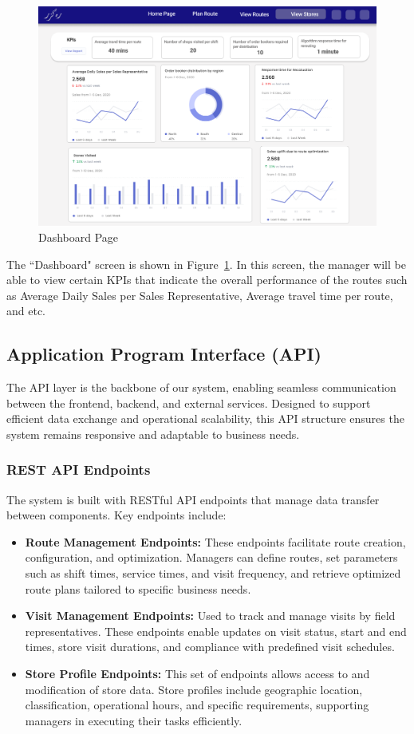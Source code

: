 \begin{figure}[H]
    \centering
    \includegraphics[width=1\textwidth]{images/Dashboard 2.png} %
    \caption{Dashboard Page}
    \label{fig:image7}
\end{figure}
The ``Dashboard" screen is shown in Figure~\ref{fig:image7}. In this screen, the manager will be able to view certain KPIs that indicate the overall performance of the routes such as Average Daily Sales per Sales Representative, Average travel time per route, and etc. 

\subsection{Application Program Interface (API)}
The API layer is the backbone of our system, enabling seamless communication between the frontend, backend, and external services. Designed to support efficient data exchange and operational scalability, this API structure ensures the system remains responsive and adaptable to business needs.

\subsubsection{REST API Endpoints}
The system is built with RESTful API endpoints that manage data transfer between components. Key endpoints include:
\begin{itemize}
    \item \textbf{Route Management Endpoints:} These endpoints facilitate route creation, configuration, and optimization. Managers can define routes, set parameters such as shift times, service times, and visit frequency, and retrieve optimized route plans tailored to specific business needs.
    \item \textbf{Visit Management Endpoints:} Used to track and manage visits by field representatives. These endpoints enable updates on visit status, start and end times, store visit durations, and compliance with predefined visit schedules.
    \item \textbf{Store Profile Endpoints:} This set of endpoints allows access to and modification of store data. Store profiles include geographic location, classification, operational hours, and specific requirements, supporting managers in executing their tasks efficiently.
\end{itemize}

